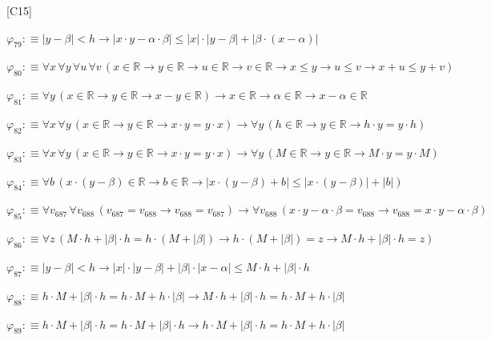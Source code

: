 \begin{fullproof}{[C15]}
\begin{abbrevlist}
\item $\varphi_{79} :\equiv \lvert y - \beta \rvert < h \to \lvert x \cdot y - \alpha \cdot \beta \rvert \leq \lvert x \rvert \cdot \lvert y - \beta \rvert + \lvert \beta \cdot (x - \alpha) \rvert$
\item $\varphi_{80} :\equiv \forall x\,\forall y\,\forall u\,\forall v\,(x \in \mathbb{R} \to y \in \mathbb{R} \to u \in \mathbb{R} \to v \in \mathbb{R} \to x \leq y \to u \leq v \to x + u \leq y + v)$
\item $\varphi_{81} :\equiv \forall y\,(x \in \mathbb{R} \to y \in \mathbb{R} \to x - y \in \mathbb{R}) \to x \in \mathbb{R} \to \alpha \in \mathbb{R} \to x - \alpha \in \mathbb{R}$
\item $\varphi_{82} :\equiv \forall x\,\forall y\,(x \in \mathbb{R} \to y \in \mathbb{R} \to x \cdot y = y \cdot x) \to \forall y\,(h \in \mathbb{R} \to y \in \mathbb{R} \to h \cdot y = y \cdot h)$
\item $\varphi_{83} :\equiv \forall x\,\forall y\,(x \in \mathbb{R} \to y \in \mathbb{R} \to x \cdot y = y \cdot x) \to \forall y\,(M \in \mathbb{R} \to y \in \mathbb{R} \to M \cdot y = y \cdot M)$
\item $\varphi_{84} :\equiv \forall b\,(x \cdot (y - \beta) \in \mathbb{R} \to b \in \mathbb{R} \to \lvert x \cdot (y - \beta) + b \rvert \leq \lvert x \cdot (y - \beta) \rvert + \lvert b \rvert)$
\item $\varphi_{85} :\equiv \forall v_{687}\,\forall v_{688}\,(v_{687} = v_{688} \to v_{688} = v_{687}) \to \forall v_{688}\,(x \cdot y - \alpha \cdot \beta = v_{688} \to v_{688} = x \cdot y - \alpha \cdot \beta)$
\item $\varphi_{86} :\equiv \forall z\,(M \cdot h + \lvert \beta \rvert \cdot h = h \cdot (M + \lvert \beta \rvert) \to h \cdot (M + \lvert \beta \rvert) = z \to M \cdot h + \lvert \beta \rvert \cdot h = z)$
\item $\varphi_{87} :\equiv \lvert y - \beta \rvert < h \to \lvert x \rvert \cdot \lvert y - \beta \rvert + \lvert \beta \rvert \cdot \lvert x - \alpha \rvert \leq M \cdot h + \lvert \beta \rvert \cdot h$
\item $\varphi_{88} :\equiv h \cdot M + \lvert \beta \rvert \cdot h = h \cdot M + h \cdot \lvert \beta \rvert \to M \cdot h + \lvert \beta \rvert \cdot h = h \cdot M + h \cdot \lvert \beta \rvert$
\item $\varphi_{89} :\equiv h \cdot M + \lvert \beta \rvert \cdot h = h \cdot M + \lvert \beta \rvert \cdot h \to h \cdot M + \lvert \beta \rvert \cdot h = h \cdot M + h \cdot \lvert \beta \rvert$

\end{abbrevlist}
\end{fullproof}
